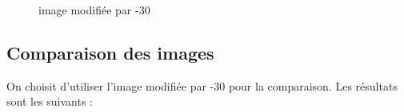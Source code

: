 \documentclass[french,a4paper,10pt]{article}
\begin{document}
\begin{figure}[!htb]
\begin{minipage}{0.3\textwidth}
            \centering
            \caption{image modifiée par -30}\label{Fig:peppersY-modif--30}
        \end{minipage}
    \end{figure}

    \newpage

    \subsection{Comparaison des images}\label{subsec:5.2}

    On choisit d'utiliser l'image modifiée par -30 pour la comparaison.
    Les résultats sont les suivants :
\end{document}
